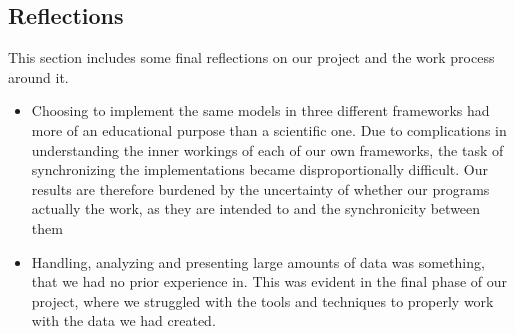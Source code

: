 \subsection{Reflections}

This section includes some final reflections on our project and the work process
around it.

\begin{itemize}
    \item Choosing to implement the same models in three different frameworks
        had more of an educational purpose than a scientific one. Due to
        complications in understanding the inner workings of each of our own
        frameworks, the task of synchronizing the implementations became
        disproportionally difficult. Our results are therefore burdened by the
        uncertainty of whether our programs actually the work, as they are
        intended to and the synchronicity between them
    \item Handling, analyzing and presenting large amounts of data was
        something, that we had no prior experience in. This was evident in the
        final phase of our project, where we struggled with the tools and
        techniques to properly work with the data we had created.
\end{itemize}

\pagebreak
